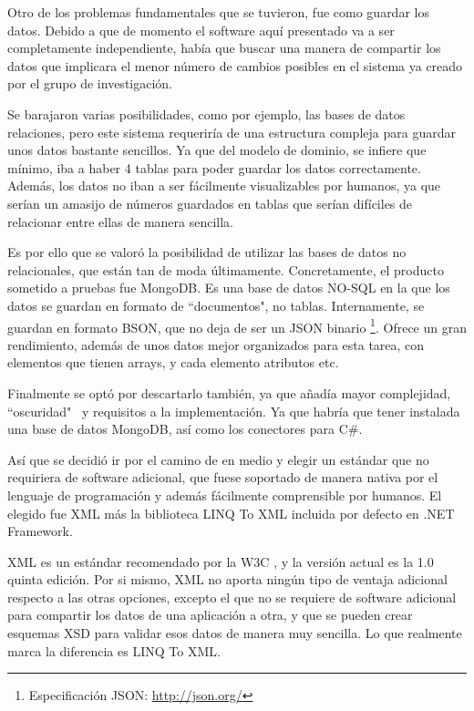Otro de los problemas fundamentales que se tuvieron, fue como guardar los datos. Debido a que de momento el software
aqu\'i presentado va a ser completamente independiente, hab\'ia que buscar una manera de compartir los datos
que implicara el menor n\'umero de cambios posibles en el sistema ya creado por el grupo de investigaci\'on.

Se barajaron varias posibilidades, como por ejemplo, las bases de datos relaciones, pero este sistema requerir\'ia
de una estructura compleja para guardar unos datos bastante sencillos. Ya que del modelo de dominio, se infiere que m\'inimo,
iba a haber 4 tablas para poder guardar los datos correctamente. Adem\'as, los datos no iban a ser f\'acilmente 
visualizables por humanos, ya que ser\'ian un amasijo de n\'umeros guardados en tablas que ser\'ian dif\'iciles de
relacionar entre ellas de manera sencilla.

Es por ello que se valor\'o la posibilidad de utilizar las bases de datos no relacionales, que est\'an tan de moda
\'ultimamente. Concretamente, el producto sometido a pruebas fue MongoDB. Es una base de datos NO-SQL en la que los
datos se guardan en formato de ``documentos", no tablas. Internamente, se guardan en formato BSON, que no deja de ser
un JSON binario \footnote{Especificaci\'{o}n JSON: \url{http://json.org/}}. Ofrece un gran rendimiento, adem\'as
de unos datos mejor organizados para esta tarea, con elementos que tienen arrays, y cada elemento atributos etc.

Finalmente se opt\'o por descartarlo tambi\'en, ya que a\~nad\'ia mayor complejidad, ``oscuridad" \ y requisitos a la 
implementaci\'on. Ya que habr\'ia que tener instalada una base de datos MongoDB, as\'i como los conectores para
C\#.

As\'i que se decidi\'o ir por el camino de en medio y elegir un est\'andar que no requiriera de software adicional,
que fuese soportado de manera nativa por el lenguaje de programaci\'on y adem\'as f\'acilmente comprensible por
humanos. El elegido fue XML m\'as la biblioteca LINQ To XML incluida por defecto en .NET Framework. 

XML es un est\'andar recomendado por la W3C \cite{XML:Specification}, y la versi\'on actual es la 1.0 quinta edici\'on.
Por si mismo, XML no aporta ning\'un tipo de ventaja adicional respecto a las otras opciones, excepto el que no se
requiere de software adicional para compartir los datos de una aplicaci\'on a otra, y que
se pueden crear esquemas XSD para validar esos datos de manera muy sencilla. 
Lo que realmente marca
la diferencia es LINQ To XML.

